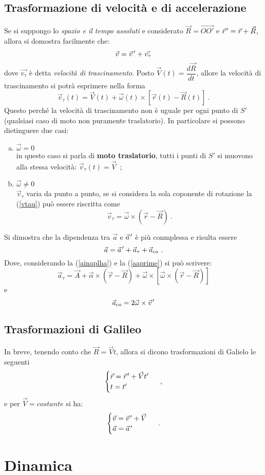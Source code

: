 \documentclass[12pt, oneside]{book}
\newcommand{\pvec}[1]{\vec{#1}\mkern2mu\vphantom{#1}}
\begin{document}
\section{Trasformazione di velocità e di accelerazione}
Se si suppongo lo \emph{spazio e il tempo assoluti} e considerato $\vec{R}=\overrightarrow{OO'}$ e $\pvec{r}'=\vec{r}+\vec{R}$, allora si domostra facilmente che:
\[\vec{v}=\pvec{v}'+\vec{v_\tau}\]
dove $\vec{v_\tau}$ è detta \emph{velocità di trascinamento}.
Posto $\vec{V}(t)=\dfrac{d\vec{R}}{dt}$, allore la velocità di trascinamento si potrà esprimere nella forma
\begin{equation}
\label{vtau}
\vec{v}_\tau(t)=\vec{V}(t)+\vec{\omega}(t)\times[\vec{r}(t)-\vec{R}(t)]~.
\end{equation}
Questo perché la velocità di trascinamento non è uguale per ogni punto di $S'$ (qualsiasi caso di moto non puramente traslatorio). In particolare si possono dietinguere due casi:
\begin{enumerate}[a)]
	\item $\vec{\omega}=0$\\
	in questo caso si parla di \textbf{moto traslatorio}, tutti i punti di $S'$ si muovono alla stessa velocità: $\vec{v}_\tau(t)=\vec{V}$~;
	\item $\vec{\omega}\neq 0$\\
	$\vec{v}_\tau$ varia da punto a punto, se si considera la sola coponente di rotazione la (\ref{vtau}) può essere riscritta come
	\[\vec{v}_\tau=\vec{\omega}\times(\vec{r}-\vec{R})~.\]
\end{enumerate}
Si dimostra che la dipendenza tra $\vec{a}$ e $\pvec{a}'$ è più conmplessa e risulta essere
\begin{equation}
\label{aaprime}
\vec{a}=\pvec{a}' + \vec{a}_\tau + \vec{a}_{co}~.
\end{equation}
\newpage
Dove, considerando la (\ref{ainaplha}) e la (\ref{aaprime}) si può scrivere:
\[\vec a_\tau=\vec A+\vec \alpha \times(\vec{r}-\vec{R})+\vec{\omega}\times[\vec{\omega}\times (\vec{r}-\vec{R})]\]
e
\[\vec{a}_{co}=2\vec{\omega}\times\pvec v'\]
\section{Trasformazioni di Galileo}
In breve, tenendo conto che $\vec R = \vec V t$, allora si dicono trasformazioni di Galielo le seguenti
\begin{align*}
	\begin{cases}
		\vec r = \pvec r' + \vec V t'\\
		t=t'
	\end{cases}~,
\end{align*}
e per $\vec V = costante$ si ha:
\begin{align*}
	\begin{cases}
		\vec v = \pvec v' + \vec V\\
		\vec a = \pvec a'
	\end{cases}~.
\end{align*}
\chapter{Dinamica}
\end{document}
